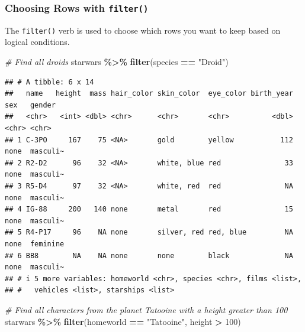 \documentclass[
  11pt,
]{article}
\newenvironment{Shaded}{\begin{snugshade}}{\end{snugshade}}
\newcommand{\CommentTok}[1]{\textcolor[rgb]{0.56,0.35,0.01}{\textit{#1}}}
\newcommand{\DecValTok}[1]{\textcolor[rgb]{0.00,0.00,0.81}{#1}}
\newcommand{\FunctionTok}[1]{\textcolor[rgb]{0.13,0.29,0.53}{\textbf{#1}}}
\newcommand{\NormalTok}[1]{#1}
\newcommand{\SpecialCharTok}[1]{\textcolor[rgb]{0.81,0.36,0.00}{\textbf{#1}}}
\newcommand{\StringTok}[1]{\textcolor[rgb]{0.31,0.60,0.02}{#1}}
\begin{document}
\subsubsection{\texorpdfstring{Choosing Rows with
\texttt{filter()}}{Choosing Rows with filter()}}\label{choosing-rows-with-filter}

The \texttt{filter()} verb is used to choose which rows you want to keep
based on logical conditions.

\begin{Shaded}
\begin{Highlighting}[]
\CommentTok{\# Find all droids}
\NormalTok{starwars }\SpecialCharTok{\%\textgreater{}\%} 
  \FunctionTok{filter}\NormalTok{(species }\SpecialCharTok{==} \StringTok{"Droid"}\NormalTok{)}
\end{Highlighting}
\end{Shaded}

\begin{verbatim}
## # A tibble: 6 x 14
##   name   height  mass hair_color skin_color  eye_color birth_year sex   gender  
##   <chr>   <int> <dbl> <chr>      <chr>       <chr>          <dbl> <chr> <chr>   
## 1 C-3PO     167    75 <NA>       gold        yellow           112 none  masculi~
## 2 R2-D2      96    32 <NA>       white, blue red               33 none  masculi~
## 3 R5-D4      97    32 <NA>       white, red  red               NA none  masculi~
## 4 IG-88     200   140 none       metal       red               15 none  masculi~
## 5 R4-P17     96    NA none       silver, red red, blue         NA none  feminine
## 6 BB8        NA    NA none       none        black             NA none  masculi~
## # i 5 more variables: homeworld <chr>, species <chr>, films <list>,
## #   vehicles <list>, starships <list>
\end{verbatim}

\begin{Shaded}
\begin{Highlighting}[]
\CommentTok{\# Find all characters from the planet Tatooine with a height greater than 100}
\NormalTok{starwars }\SpecialCharTok{\%\textgreater{}\%} 
  \FunctionTok{filter}\NormalTok{(homeworld }\SpecialCharTok{==} \StringTok{"Tatooine"}\NormalTok{, height }\SpecialCharTok{\textgreater{}} \DecValTok{100}\NormalTok{)}
\end{Highlighting}
\end{Shaded}
\end{document}
